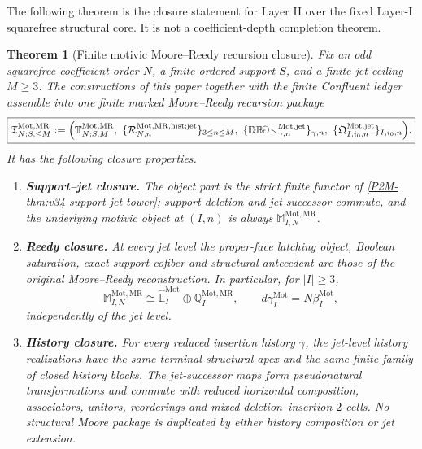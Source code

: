 \documentclass[11pt]{article}
\newtheorem{theorem}{Theorem}[section]
\theoremstyle{remark}
\newcommand{\Mot}{\mathrm{Mot}}
\newcommand{\MR}{\mathrm{MR}}
\begin{document}
The following theorem is the closure statement for Layer II over the fixed Layer-I squarefree structural core.  It is not a coefficient-depth completion theorem.

\begin{theorem}[Finite motivic Moore--Reedy recursion closure]
\label{P2M-thm:v38-finite-motivic-recursion-closure}
Fix an odd squarefree coefficient order $N$, a finite ordered support $S$, and
a finite jet ceiling $M\ge3$.  The constructions of this paper together with
the finite Confluent ledger assemble into one finite marked
Moore--Reedy recursion package
\begin{equation}\label{P2M-eq:v38-finite-recursion-package}
 \boxed{
 \mathfrak T^{\Mot,\MR}_{N;S,\le M}
 :=\Bigl(
   \mathbb T^{\Mot,\MR}_{N;S,M},\
   \{\mathcal R^{\Mot,\MR,\mathrm{hist};\mathrm{jet}}_{N,n}\}_{3\le n\le M},\
   \{\mathbb{DBar}^{\Mot,\mathrm{jet}}_{\gamma,n}\}_{\gamma,n},\
   \{\mathfrak Q^{\Mot,\mathrm{jet}}_{I,i_0,n}\}_{I,i_0,n}
 \Bigr).}
\end{equation}
It has the following closure properties.
\begin{enumerate}[label=\textup{(\roman*)}]
\item \textbf{Support--jet closure.}
The object part is the strict finite functor of
\cref{P2M-thm:v34-support-jet-tower}; support deletion and jet successor commute,
and the underlying motivic object at $(I,n)$ is always
$\mathbb M_{I,N}^{\Mot,\MR}$.

\item \textbf{Reedy closure.}
At every jet level the proper-face latching object, Boolean saturation,
exact-support cofiber and structural antecedent are those of the original
Moore--Reedy reconstruction.  In particular, for $|I|\ge3$,
\[
 \mathbb M_{I,N}^{\Mot,\MR}
 \cong
 \widehat{\mathbb L}_I^{\Mot}\oplus\mathbb Q_I^{\Mot,\MR},
 \qquad
 d\gamma_I^{\Mot}=N\beta_I^{\Mot},
\]
independently of the jet level.

\item \textbf{History closure.}
For every reduced insertion history $\gamma$, the jet-level history
realizations have the same terminal structural apex and the same finite family
of closed history blocks.  The jet-successor maps form pseudonatural
transformations and commute with reduced horizontal composition, associators,
unitors, reorderings and mixed deletion--insertion $2$-cells.  No structural
Moore package is duplicated by either history composition or jet extension.


\end{enumerate}
\end{theorem}
\end{document}

